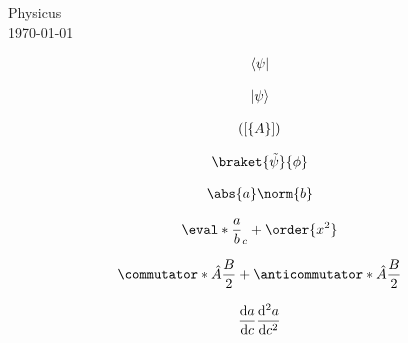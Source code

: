 \documentclass[11pt]{article}
\begin{document}
\begin{center}
  {\Large Physicus} \\ \vspace{5mm}
  \today
\end{center}

\begin{align*}
  \langle\psi\rvert
\end{align*}

\begin{align*}
  \lvert\psi\rangle
\end{align*}

\begin{align*}
  \lparen\lbrack\lbrace A\rbrace\rbrack\rparen
\end{align*}

\begin{align*}
  \braket{\tilde{\psi}}{\phi}
\end{align*}

\begin{align*}
  \abs{a}\norm{b}
\end{align*}

\begin{align*}
  \eval*{\frac{a}{b}}_c + \order{x^2}
\end{align*}

\begin{align*}
  \commutator*{\hat{A}}{\frac{B}{2}} + \anticommutator*{\hat{A}}{\frac{B}{2}}
\end{align*}

\begin{align*}
  \dv{a}{c}\dv[2]{a}{c}
\end{align*}
\end{document}
